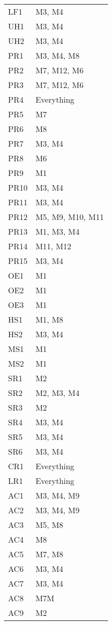 \documentclass[12pt, titlepage]{article}
\begin{document}
\begin{longtable}{p{} p{}}
  LF1  & M3, M4 \\
  UH1  & M3, M4 \\
  UH2  & M3, M4 \\
  PR1  & M3, M4, M8 \\
  PR2  & M7, M12, M6 \\
  PR3  & M7, M12, M6 \\
  PR4  & Everything \\
  PR5  & M7 \\
  PR6  & M8 \\
  PR7  & M3, M4 \\
  PR8  & M6 \\
  PR9  & M1 \\
  PR10 & M3, M4 \\
  PR11 & M3, M4 \\
  PR12 & M5, M9, M10, M11 \\
  PR13 & M1, M3, M4 \\
  PR14 & M11, M12 \\
  PR15 & M3, M4 \\
  OE1  & M1 \\
  OE2  & M1 \\
  OE3  & M1 \\
  HS1  & M1, M8 \\
  HS2  & M3, M4 \\
  MS1  & M1 \\
  MS2  & M1 \\
  SR1  & M2 \\
  SR2  & M2, M3, M4 \\
  SR3  & M2 \\
  SR4  & M3, M4 \\
  SR5  & M3, M4 \\
  SR6  & M3, M4 \\
  CR1  & Everything \\
  LR1  & Everything \\
  AC1  & M3, M4, M9 \\
  AC2  & M3, M4, M9 \\
  AC3  & M5, M8 \\
  AC4  & M8 \\
  AC5  & M7, M8 \\
  AC6  & M3, M4 \\
  AC7  & M3, M4 \\
  AC8  & M7M \\
  AC9  & M2 \\
  \end{longtable}
\end{document}
